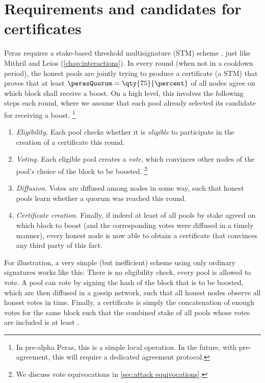 \chapter{Requirements and candidates for certificates}\label{chap:req cands certs}

Peras requires a stake-based threshold multisignature (STM) scheme \parencite{chaidos2024mithril}, just like Mithril and Leios (\cref{chap:interactions}).
In every round (when not in a cooldown period), the honest pools are jointly trying to produce a certificate (a STM) that proves that at least $\perasQuorum = \qty{75}{\percent}$ of all nodes agree on which block shall receive a boost.
On a high level, this involves the following steps each round, where we assume that each pool already selected its candidate for receiving a boost.%
\footnote{In pre-alpha Peras, this is a simple local operation. In the future, with pre-agreement, this will require a dedicated agreement protocol.}
\begin{enumerate}
\item
  \emph{Eligibility.}
  Each pool checks whether it is \emph{eligible} to participate in the creation of a certificate this round.
\item
  \emph{Voting.}
  Each eligible pool creates a \emph{vote}, which convinces other nodes of the pool's choice of the block to be boosted.%
  \footnote{We discuss vote equivocations in \cref{sec:attack equivocations}.}
\item
  \emph{Diffusion.}
  Votes are diffused among nodes in some way, such that honest pools learn whether a quorum was reached this round.
\item
  \emph{Certificate creation.}
  Finally, if indeed at least \perasQuorum{} of all pools by stake agreed on which block to boost (and the corresponding votes were diffused in a timely manner), every honest node is now able to obtain a certificate that convinces any third party of this fact.
\end{enumerate}

For illustration, a very simple (but inefficient) scheme using only ordinary signatures works like this:
There is no eligibility check, every pool is allowed to vote.
A pool can vote by signing the hash of the block that is to be boosted, which are then diffused in a gossip network, such that all honest nodes observe all honest votes in time.
Finally, a certificate is simply the concatenation of enough votes for the same block such that the combined stake of all pools whose votes are included is at least \perasQuorum{}.

